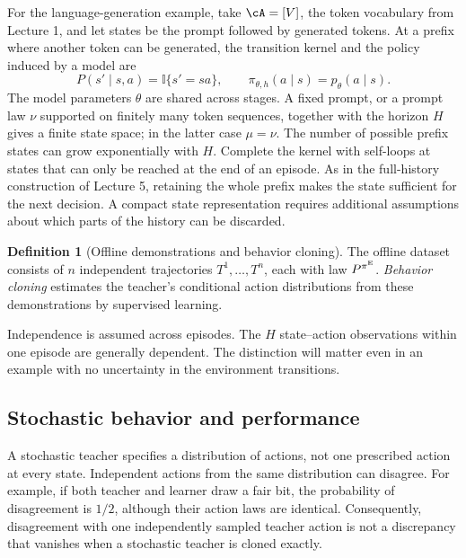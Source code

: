 \documentclass[11pt,twoside]{article}
\newcommand{\I}{\mathbb I}
\theoremstyle{definition}
\newtheorem{definition}[theorem]{Definition}
\theoremstyle{remark}
\begin{document}
For the language-generation example, take $\cA=[V]$, the token vocabulary
from Lecture 1, and let states be the prompt followed by generated tokens.
At a prefix where another token can be generated, the transition kernel and
the policy induced by a model are
\[
 P(s'\mid s,a)=\I\{s'=sa\},\qquad
 \pi_{\theta,h}(a\mid s)=p_\theta(a\mid s).
\]
The model parameters $\theta$ are shared across stages. A fixed prompt, or
a prompt law $\nu$ supported on finitely many token sequences, together
with the horizon $H$ gives a finite state space; in the latter case
$\mu=\nu$. The number of possible prefix states can grow exponentially
with $H$. Complete the kernel with self-loops at states that can only be
reached at the end of an episode.
As in the full-history construction of Lecture 5, retaining the
whole prefix makes the state sufficient for the next decision. A compact state representation
requires additional assumptions about which parts of the history can be
discarded.

\begin{definition}[Offline demonstrations and behavior cloning]
The offline dataset consists of $n$ independent trajectories
$T^1,\ldots,T^n$, each with law $P^{\pi^{\rm E}}$.
\emph{Behavior cloning} estimates the teacher's conditional action
distributions from these demonstrations by supervised learning.
\end{definition}

Independence is assumed across episodes. The $H$ state--action observations
within one episode are generally dependent. The distinction will matter even
in an example with no uncertainty in the environment transitions.

\subsection{Stochastic behavior and performance}

A stochastic teacher specifies a distribution of actions, not one prescribed
action at every state. Independent actions from the same distribution can
disagree. For example, if both teacher and learner draw a fair bit, the
probability of disagreement is $1/2$, although their action laws are identical.
Consequently, disagreement with one independently sampled teacher action is
not a discrepancy that vanishes when a stochastic teacher is cloned exactly.
\end{document}
